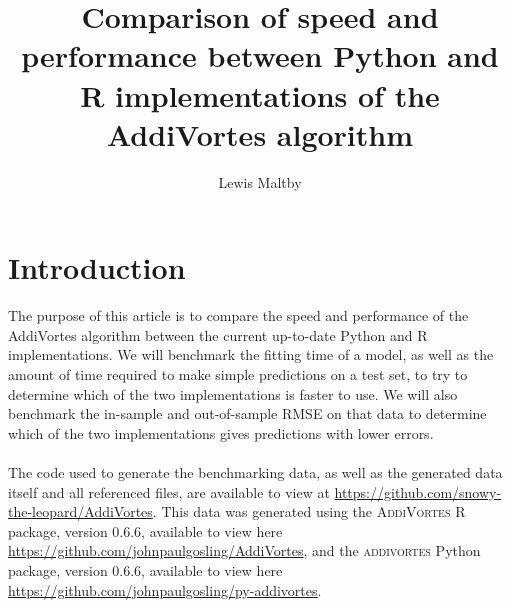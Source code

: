 \documentclass[11pt,twoside,a4paper]{article}
\title{Comparison of speed and performance between Python and R implementations of the AddiVortes algorithm}
\author{Lewis Maltby}
\begin{document}
\maketitle
\section{Introduction}

The purpose of this article is to compare the speed and performance of the AddiVortes algorithm between the current up-to-date Python and R implementations. We will benchmark the fitting time of a model, as well as the amount of time required to make simple predictions on a test set, to try to determine which of the two implementations is faster to use. We will also benchmark the in-sample and out-of-sample RMSE on that data to determine which of the two implementations gives predictions with lower errors.
\\\\
The code used to generate the benchmarking data, as well as the generated data itself and all referenced files, are available to view at \url{https://github.com/snowy-the-leopard/AddiVortes}. This data was generated using the \textsc{AddiVortes} R package, version 0.6.6, available to view here \url{https://github.com/johnpaulgosling/AddiVortes}, and the \textsc{addivortes} Python package, version 0.6.6, available to view here \url{https://github.com/johnpaulgosling/py-addivortes}.
\end{document}
